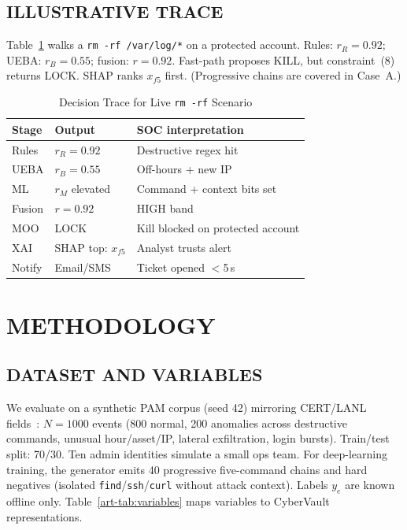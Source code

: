 \subsection{ILLUSTRATIVE TRACE}
Table~\ref{art-tab:case-study} walks a \texttt{rm -rf /var/log/*} on a protected account. Rules: $r_R=0.92$; UEBA: $r_B=0.55$; fusion: $r=0.92$. Fast-path proposes KILL, but constraint~(8) returns LOCK. SHAP ranks $x_{f5}$ first. (Progressive chains are covered in Case~A.)

\begin{table}[H]
\caption{Decision Trace for Live \texttt{rm -rf} Scenario}
\label{art-tab:case-study}
\centering
\footnotesize
\begin{tabular}{lll}
\toprule
\textbf{Stage} & \textbf{Output} & \textbf{SOC interpretation} \\
\midrule
Rules & $r_R{=}0.92$ & Destructive regex hit \\
UEBA & $r_B{=}0.55$ & Off-hours + new IP \\
ML & $r_M$ elevated & Command + context bits set \\
Fusion & $r{=}0.92$ & HIGH band \\
MOO & LOCK & Kill blocked on protected account \\
XAI & SHAP top: $x_{f5}$ & Analyst trusts alert \\
Notify & Email/SMS & Ticket opened $<$5\,s \\
\bottomrule
\end{tabular}
\end{table}

\section{METHODOLOGY}
\label{art-sec:method}

\subsection{DATASET AND VARIABLES}
We evaluate on a synthetic PAM corpus (seed 42) mirroring CERT/LANL fields~\cite{ref10}: $N=1000$ events (800 normal, 200 anomalies across destructive commands, unusual hour/asset/IP, lateral exfiltration, login bursts). Train/test split: 70/30. Ten admin identities simulate a small ops team. For deep-learning training, the generator emits 40 progressive five-command chains and hard negatives (isolated \texttt{find}/\texttt{ssh}/\texttt{curl} without attack context). Labels $y_e$ are known offline only. Table~\ref{art-tab:variables} maps variables to CyberVault representations.

